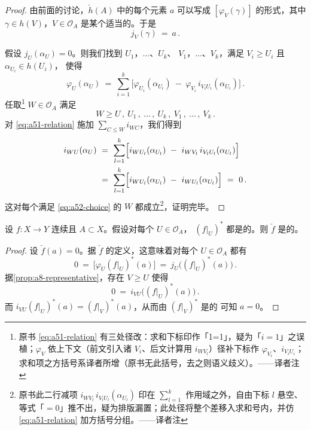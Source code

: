 \begin{proof}
由前面的讨论，$\check{h}(A)$ 中的每个元素 $a$ 可以写成
$[\varphi_{V}(\gamma)]$ 的形式，其中 $\gamma\in h(V)$，$V\in\mathcal{O}_{A}$
是某个适当的\trNeighborhood。于是
\[j_{V}(\gamma)\ =\ a\,.
\]

假设 $j_{U}(\alpha_{U})=0$。则我们找到 $U_{1}$，$\ldots$、$U_{k}$、
$V_{1}$，$\ldots$、$V_{k}$，满足 $V_{i}\geq U_{i}$ 且 $\alpha_{U_{i}}\in h(U_{i})$，
使得
\begin{equation}\label{eq:a51-relation}
\varphi_{U}(\alpha_{U})\ =\ \sum_{i=1}^{k}\bigl[\varphi_{U_{i}}(\alpha_{U_{i}})\ -\ \varphi_{V_{i}}\,i_{V_{i}U_{i}}(\alpha_{U_{i}})\bigr]\,.
\end{equation}
任取\footnote{原书 \eqref{eq:a51-relation} 有三处径改：求和下标印作「1=1」，疑为「$i=1$」之误植；$\varphi_{V}$ 依上下文（前文引入诸 $V_{i}$、后文计算用 $i_{WV_{l}}$）径补下标作 $\varphi_{V_{i}}$、$i_{V_{i}U_{i}}$；求和项之方括号系译者所增（原书无此括号，去之则语义歧义）。——译者注} $W\in\mathcal{O}_{A}$ 满足
\begin{equation}\label{eq:a52-choice}
W\geq U\,,\ U_{1}\,,\ \ldots\,,\ U_{k}\,,\ V_{1}\,,\ \ldots\,,\ V_{k}\,.
\end{equation}
对 \eqref{eq:a51-relation} 施加 $\sum_{C\leq W}i_{WC}$，我们得到
\begin{align*}
i_{WU}(\alpha_{U})\ &=\ \sum_{l=1}^{k}\Bigl[i_{WU_{l}}(\alpha_{U_{l}})\ -\ i_{WV_{l}}\,i_{V_{l}U_{l}}(\alpha_{U_{l}})\Bigr]\\
&=\ \sum_{l=1}^{k}\Bigl[i_{WU_{l}}(\alpha_{U_{l}})\ -\ i_{WU_{l}}(\alpha_{U_{l}})\Bigr]\ =\ 0\,.
\end{align*}
这对每个满足 \eqref{eq:a52-choice} 的 $W$ 都成立\footnote{原书此二行减项 $i_{WV_{l}}\,i_{V_{l}U_{l}}(\alpha_{U_{l}})$ 印在 $\sum_{l=1}^{k}$ 作用域之外，自由下标 $l$ 悬空、等式「$=0$」推不出，疑为排版漏置；此处径将整个差移入求和号内，并仿 \eqref{eq:a51-relation} 加方括号分组。——译者注}，证明完毕。
\end{proof}


\begin{theorem}\label{thm:a8-check-f-injective}
设 $f\colon X\to Y$ 连续且 $A\subset X$。假设对每个 $U\in\mathcal{O}_{A}$，%
$(f|_{U})^{*}$ 都是\trInjective{}的。则 $\check{f}$ 是\trInjective{}的。
\end{theorem}

\begin{proof}
设 $\check{f}(a)=0$。据 $\check{f}$ 的定义，这意味着对每个 $U\in\mathcal{O}_{A}$ 都有%
\[0\ =\ \bigl[\varphi_{U}(f|_{U})^{*}(a)\bigr]\ =\ j_{U}\bigl((f|_{U})^{*}(a)\bigr)\,.\]
据\cref{prop:a8-representative}，存在 $V\geq U$ 使得
\[0\ =\ i_{VU}\bigl((f|_{U})^{*}(a)\bigr)\,.\]
而 $i_{VU}(f|_{U})^{*}(a)=(f|_{V})^{*}(a)$，从而由 $(f|_{V})^{*}$ 是\trInjective{}的%
可知 $a=0$。
\end{proof}

